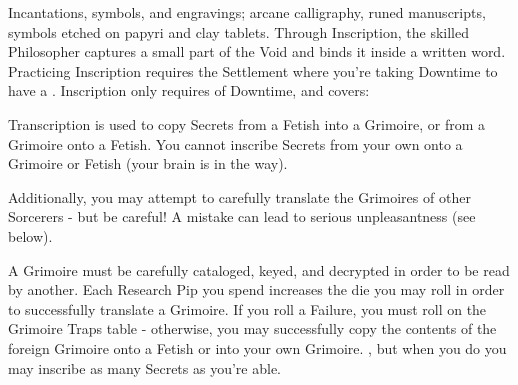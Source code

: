 






Incantations, symbols, and engravings; arcane calligraphy, runed manuscripts, symbols etched on papyri and clay tablets. Through Inscription, the skilled Philosopher captures a small part of the Void and binds it inside a written word. Practicing Inscription requires the Settlement where you're taking Downtime to have a . Inscription only requires  of Downtime, and covers:




Transcription is used to copy Secrets from a Fetish into a Grimoire, or from a Grimoire onto a Fetish. You cannot inscribe Secrets from your own  onto a Grimoire or Fetish (your brain is in the way).

Additionally, you may attempt to carefully translate the Grimoires of other Sorcerers - but be careful! A mistake can lead to serious unpleasantness (see  below).




A Grimoire must be carefully cataloged, keyed, and decrypted in order to be read by another. Each Research Pip you spend increases the die you may roll in order to successfully translate a Grimoire. If you roll a Failure, you must roll on the Grimoire Traps table - otherwise, you may successfully copy the contents of the foreign Grimoire onto a Fetish or into your own Grimoire. , but when you do you may inscribe as many Secrets as you're able.

